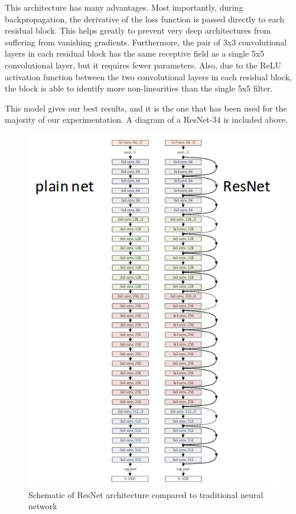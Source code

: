\documentclass[10pt,twocolumn,letterpaper]{article}
\begin{document}
This architecture has many advantages. Most importantly, during backpropagation, the derivative of the loss function is passed directly to each residual block. This helps greatly to prevent very deep architectures from suffering from vanishing gradients. Furthermore, the pair of 3x3 convolutional layers in each residual block has the same receptive field as a single 5x5 convolutional layer, but it requires fewer parameters. Also, due to the ReLU activation function between the two convolutional layers in each residual block, the block is able to identify more non-linearities than the single 5x5 filter.

This model gives our best results, and it is the one that has been used for the majority of our experimentation. A diagram of a ResNet-34 is included above.

\begin{figure}
    \includegraphics[width=\columnwidth]{fig/resnet_vs_plainnet.png}
    \caption{Schematic of ResNet architecture compared to traditional neural network \cite{ResNet}}
    \label{fig:resnet_plainent}
\end{figure}
\end{document}
